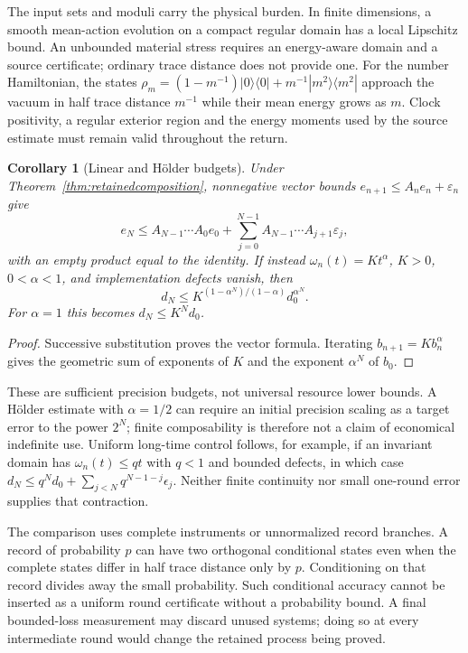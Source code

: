 \documentclass[12pt]{article}
\newtheorem{corollary}[theorem]{Corollary}
\theoremstyle{definition}
\theoremstyle{remark}
\begin{document}
The input sets and moduli carry the physical burden. In finite
dimensions, a smooth mean-action evolution on a compact regular domain
has a local Lipschitz bound. An unbounded material stress requires an
energy-aware domain and a source certificate; ordinary trace distance
does not provide one. For the number Hamiltonian, the states
$\rho_m=(1-m^{-1})|0\rangle\langle0|+
m^{-1}|m^2\rangle\langle m^2|$ approach the vacuum in half trace
distance $m^{-1}$ while their mean energy grows as $m$.
Clock positivity, a regular exterior region and the energy moments
used by the source estimate must remain valid throughout the return.

\begin{corollary}[Linear and H\"older budgets]\label{cor:returnbudgets}
Under Theorem~\ref{thm:retainedcomposition}, nonnegative vector
bounds $e_{n+1}\le A_ne_n+\varepsilon_n$ give
\[
 e_N\le A_{N-1}\cdots A_0e_0+
 \sum_{j=0}^{N-1}A_{N-1}\cdots A_{j+1}\varepsilon_j,
\]
with an empty product equal to the identity.
If instead $\omega_n(t)=K t^\alpha$, $K>0$, $0<\alpha<1$,
and implementation defects vanish, then
\[
 d_N\le K^{(1-\alpha^N)/(1-\alpha)}d_0^{\alpha^N}.
\]
For $\alpha=1$ this becomes $d_N\le K^N d_0$.
\end{corollary}
\begin{proof}
Successive substitution proves the vector formula. Iterating
$b_{n+1}=Kb_n^\alpha$ gives the geometric sum of exponents of $K$
and the exponent $\alpha^N$ of $b_0$.
\end{proof}

These are sufficient precision budgets, not universal resource lower
bounds. A H\"older estimate with $\alpha=1/2$ can require an initial
precision scaling as a target error to the power $2^N$; finite
composability is therefore not a claim of economical indefinite use.
Uniform long-time control follows, for example, if an invariant domain
has $\omega_n(t)\le qt$ with $q<1$ and bounded defects, in which
case $d_N\le q^Nd_0+\sum_{j<N}q^{N-1-j}\epsilon_j$.
Neither finite continuity nor small one-round error supplies that
contraction.

The comparison uses complete instruments or unnormalized record
branches. A record of probability $p$ can have two orthogonal
conditional states even when the complete states differ in half trace
distance only by $p$. Conditioning on that record divides away the
small probability. Such conditional accuracy cannot be inserted as a
uniform round certificate without a probability bound. A final
bounded-loss measurement may discard unused systems; doing so at every
intermediate round would change the retained process being proved.
\end{document}
